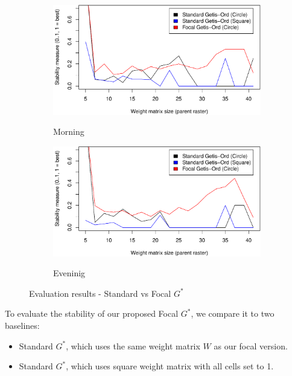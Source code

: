 \documentclass{itatnew}
\begin{document}
\begin{figure}[htp]
  \begin{subfigure}{\linewidth}
    \caption{Morning}
    \includegraphics[width=\linewidth]{images/hotspot-eval-gstar-1}
    \label{fig:EvalMorning}
  \end{subfigure}
  \hspace{1em}
  \begin{subfigure}{\linewidth}
    \caption{Eveninig}
    \includegraphics[width=\linewidth]{images/hotspot-eval-gstar-2}
    \label{fig:EvalEvening}
  \end{subfigure}
  \caption{Evaluation results - Standard vs Focal $G^*$}
  \label{fig:EvalResults}
\end{figure}

%

To evaluate the stability of our proposed Focal $G^*$, we compare it to two 
baselines:
\begin{itemize}
  \item Standard $G^*$, which uses the same weight matrix $W$ as our focal 
  version.
  \item Standard $G^*$, which uses square weight matrix with all cells set to 1.
\end{itemize}
\end{document}
